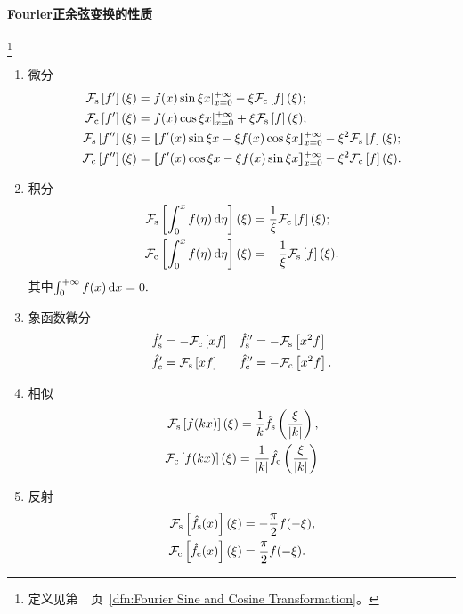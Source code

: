\paragraph*{Fourier正余弦变换的性质}\label{The Property of Sine and Cosine Transformation}\footnote{定义见第~\pageref{dfn:Fourier Sine and Cosine Transformation}~页~\ref{dfn:Fourier Sine and Cosine Transformation}。}
\begin{enumerate}
	\item 微分
	\begin{align*}
		\cf[s]{f'}(\xi)&=f(x)\sin\xi x|_{x=0}^{+\infty}-\xi\cf[c]f(\xi);\\
		\cf[c]{f'}(\xi)&=f(x)\cos\xi x|_{x=0}^{+\infty}+\xi\cf[s]f(\xi);\\
		\cf[s]{f''}(\xi)&=\zkh{f'(x)\sin\xi x-\xi f(x)\cos\xi x}_{x=0}^{+\infty}-\xi^2\cf[s]f(\xi);\\
		\cf[c]{f''}(\xi)&=\zkh{f'(x)\cos\xi x-\xi f(x)\sin\xi x}_{x=0}^{+\infty}-\xi^2\cf[c]f(\xi).
	\end{align*}
	\item 积分
	\begin{align*}
		\cf[s]{\int_0^xf(\eta)\d\eta}(\xi)&=\frac1\xi\cf[c]f(\xi);\\
		\cf[c]{\int_0^xf(\eta)\d\eta}(\xi)&=-\frac1\xi\cf[s]f(\xi).
	\end{align*}
	其中$\int\zti f(x)\d x=0.$
	\item 象函数微分
	\begin{align*}
		\hat f_\sine'&=-\cf[c]{xf}&\hat f_\sine''&=-\cf[s]{x^2f}\\
		\hat f_\cosi'&=\cf[s]{xf}&\hat f_\cosi''&=-\cf[c]{x^2f}.
	\end{align*}
	\item 相似\begin{align*}
		\cf[s]{f(kx)}(\xi)=\frac1k\hat f_\sine\kh{\frac\xi{\abs k}},\\
		\cf[c]{f(kx)}(\xi)=\frac1{\abs k}\hat f_\cosi\kh{\frac\xi{\abs k}}
	\end{align*}
	\item 反射\begin{align*}
		\cf[s]{\hat f_\sine(x)}(\xi)&=-\frac\pi{2}f(-\xi),\\
		\cf[c]{\hat f_\cosi(x)}(\xi)&=\frac\pi{2}f(-\xi).
	\end{align*}
\end{enumerate}
\newpage
